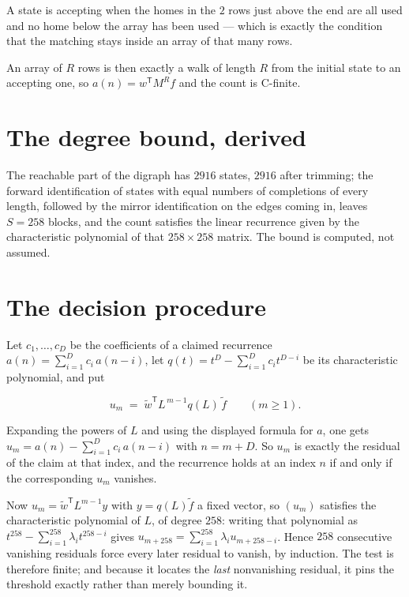 \documentclass[11pt]{article}
\theoremstyle{definition}
\begin{document}
A state is accepting when the homes in the $2$ rows just above the end are all used and no home below the array has been used --- which is exactly the condition that the matching stays inside an array of that many rows.

An array of $R$ rows is then exactly a walk of length $R$ from the initial state to an accepting one, so $a(n) = w^{\mathsf T}M^{R}f$ and the count is C-finite.

\section{The degree bound, derived}

The reachable part of the digraph has $2916$ states, $2916$ after trimming; the forward identification of states with equal numbers of completions of every length, followed by the mirror identification on the edges coming in, leaves $S = 258$ blocks, and the count satisfies the linear recurrence given by the characteristic polynomial of that $258\times258$ matrix. The bound is computed, not assumed.

\section{The decision procedure}

Let $c_1,\dots,c_D$ be the coefficients of a claimed recurrence $a(n) = \sum_{i=1}^{D} c_i\,a(n-i)$, let $q(t) = t^{D} - \sum_{i=1}^{D} c_i t^{D-i}$ be its characteristic polynomial, and put

\[u_m \;=\; \tilde w^{\mathsf T} L^{\,m-1} q(L)\,\tilde f \qquad (m \ge 1).\]

Expanding the powers of $L$ and using the displayed formula for $a$, one gets $u_m = a(n) - \sum_{i=1}^{D} c_i\,a(n-i)$ with $n = m + D$. So $u_m$ is exactly the residual of the claim at that index, and the recurrence holds at an index $n$ if and only if the corresponding $u_m$ vanishes.

Now $u_m = \tilde w^{\mathsf T} L^{m-1} y$ with $y = q(L)\tilde f$ a fixed vector, so $(u_m)$ satisfies the characteristic polynomial of $L$, of degree $258$: writing that polynomial as $t^{258} - \sum_{i=1}^{258} \lambda_i t^{258-i}$ gives $u_{m+258} = \sum_{i=1}^{258} \lambda_i u_{m+258-i}$. Hence $258$ consecutive vanishing residuals force every later residual to vanish, by induction. The test is therefore finite; and because it locates the {\itshape last} nonvanishing residual, it pins the threshold exactly rather than merely bounding it.
\end{document}
